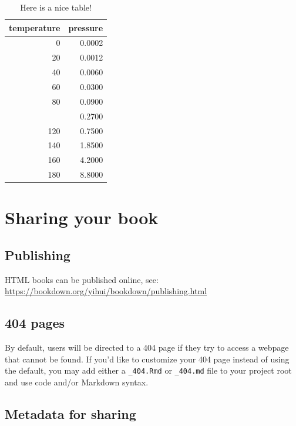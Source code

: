 \documentclass[
]{book}
\theoremstyle{definition}
\theoremstyle{definition}
\theoremstyle{definition}
\theoremstyle{definition}
\theoremstyle{remark}
\begin{document}
\begin{table}

\caption{\label{tab:nice-tab}Here is a nice table!}
\centering
\begin{tabular}[t]{rr}
\toprule
temperature & pressure\\
\midrule
0 & 0.0002\\
20 & 0.0012\\
40 & 0.0060\\
60 & 0.0300\\
80 & 0.0900\\
\addlinespace
100 & 0.2700\\
120 & 0.7500\\
140 & 1.8500\\
160 & 4.2000\\
180 & 8.8000\\
\bottomrule
\end{tabular}
\end{table}

\hypertarget{sharing-your-book}{%
\section{Sharing your book}\label{sharing-your-book}}

\hypertarget{publishing}{%
\subsection{Publishing}\label{publishing}}

HTML books can be published online, see: \url{https://bookdown.org/yihui/bookdown/publishing.html}

\hypertarget{pages}{%
\subsection{404 pages}\label{pages}}

By default, users will be directed to a 404 page if they try to access a webpage that cannot be found. If you'd like to customize your 404 page instead of using the default, you may add either a \texttt{\_404.Rmd} or \texttt{\_404.md} file to your project root and use code and/or Markdown syntax.

\hypertarget{metadata-for-sharing}{%
\subsection{Metadata for sharing}\label{metadata-for-sharing}}
\end{document}

